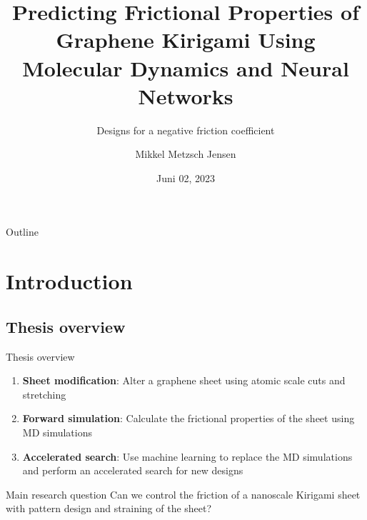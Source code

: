 \documentclass[
	10pt, %
]{beamer}
\title[Predicting Graphene Kirigami Friction]{Predicting Frictional Properties of Graphene Kirigami Using Molecular Dynamics and Neural Networks}
\subtitle{Designs for a negative friction coefficient}
\author[Mikkel Metzsch Jensen]{Mikkel Metzsch Jensen}
\institute[UiO]{University of Oslo}
\date[Juni 02, 2023]{Juni 02, 2023}
\begin{document}

\begin{frame}
	\titlepage %
\end{frame}


\begin{frame}{Outline}
    \tableofcontents
\end{frame}
%
%
\section{Introduction} %
\subsection{Thesis overview}
\begin{frame}{Thesis overview}
	\begin{enumerate}
		\setlength\itemsep{1em}
		\item \textbf{Sheet modification}: Alter a graphene sheet using atomic scale cuts and stretching
		\item \textbf{Forward simulation}: Calculate the frictional properties of the sheet using MD simulations
		\item \textbf{Accelerated search}: Use machine learning to replace the MD simulations and perform an accelerated search for new designs
	\end{enumerate}
	\vspace{2mm}
	\begin{center}
		\begin{minipage}{0.7\textwidth}
			\begin{block}{Main research question}
				Can we control the friction of a nanoscale Kirigami sheet with pattern design and straining of the sheet?
			\end{block}	
		\end{minipage}
	\end{center}

\end{frame}
%
%
\end{document}
